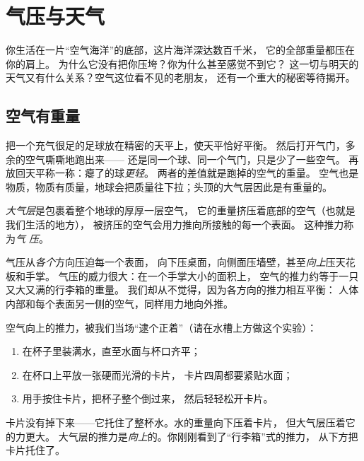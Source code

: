 \chapter{气压与天气}\label{ch:g5:air-pressure-weather}

你生活在一片“空气海洋”的底部，这片海洋深达数百千米，
它的全部重量都压在你的肩上。
为什么它没有把你压垮？你为什么甚至感觉不到它？
这一切与明天的天气又有什么关系？空气这位看不见的老朋友，
还有一个重大的秘密等待揭开。

\section{空气有重量}

\begin{example}[称一称看不见的东西]\label{ex:g5:air-pressure-weather:weighing}
把一个充气很足的足球放在精密的天平上，使天平恰好平衡。
然后打开气门，多余的空气嘶嘶地跑出来——
还是同一个球、同一个气门，只是少了一些空气。
再放回天平称一称：瘪了的球\emph{更轻}。
两者的差值就是跑掉的空气的重量。
空气也是物质，物质有质量，地球会把质量往下拉；头顶的大气层因此是有重量的。
\end{example}

\begin{definition}[大气层与气压]\label{def:g5:air-pressure-weather:pressure}
\emph{大气层}是包裹着整个地球的厚厚一层空气，
它的重量挤压着底部的空气（也就是我们生活的地方），
被挤压的空气会用力推向所接触的每一个表面。
这种推力称为\emph{气
压}。
\end{definition}

\begin{proposition}[来自各方的推力]\label{prop:g5:air-pressure-weather:allsides}
气压从\emph{各个}方向压迫每一个表面，
向下压桌面，向侧面压墙壁，甚至\emph{向上}压天花板和手掌。
气压的威力很大：在一个手掌大小的面积上，
空气的推力约等于一只又大又满的行李箱的重量。
我们却从不觉得，因为各方向的推力相互平衡：
人体内部和每个表面另一侧的空气，同样用力地向外推。
\end{proposition}

\begin{method}[托住水的硬纸片]\label{met:g5:air-pressure-weather:card}
空气向上的推力，被我们当场“逮个正着”（请在水槽上方做这个实验）：
\begin{enumerate}
  \item 在杯子里装满水，直至水面与杯口齐平；
  \item 在杯口上平放一张硬而光滑的卡片，
        卡片四周都要紧贴水面；
  \item 用手按住卡片，把杯子整个倒过来，
        然后轻轻松开卡片。
\end{enumerate}
卡片没有掉下来——它托住了整杯水。水的重量向下压着卡片，
但大气层压着它的力更大。
大气层的推力是\emph{向上}的。你刚刚看到了“行李箱”式的推力，
从下方把卡片托住了。
\end{method}

